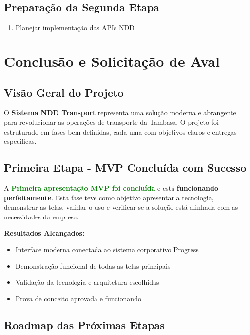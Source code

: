 \documentclass[12pt,a4paper]{article}
\begin{document}
\subsection{Preparação da Segunda Etapa}
\begin{enumerate}
    \item Planejar implementação das APIs NDD
\end{enumerate}

\vfill

\section*{Conclusão e Solicitação de Aval}

\subsection*{Visão Geral do Projeto}

O \textbf{Sistema NDD Transport} representa uma solução moderna e abrangente para revolucionar as operações de transporte da Tambasa. O projeto foi estruturado em fases bem definidas, cada uma com objetivos claros e entregas específicas.

\subsection*{Primeira Etapa - MVP Concluída com Sucesso}

A \textcolor{green}{\textbf{Primeira apresentação MVP foi concluída}} e está \textbf{funcionando perfeitamente}. Esta fase teve como objetivo apresentar a tecnologia, demonstrar as telas, validar o uso e verificar se a solução está alinhada com as necessidades da empresa.

\textbf{Resultados Alcançados:}
\begin{itemize}
    \item Interface moderna conectada ao sistema corporativo Progress
    \item Demonstração funcional de todas as telas principais
    \item Validação da tecnologia e arquitetura escolhidas
    \item Prova de conceito aprovada e funcionando
\end{itemize}

\subsection*{Roadmap das Próximas Etapas}
\end{document}
